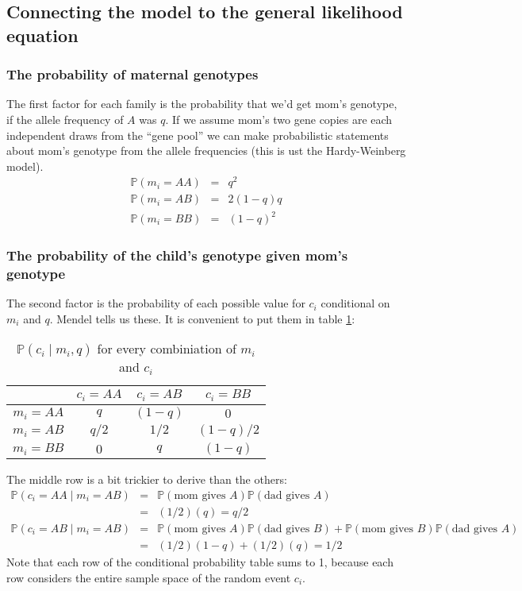 \documentclass[11pt]{article}
\renewcommand{\Pr}{\mathbb{P}}
\begin{document}
\subsection{Connecting the model to the general likelihood equation}
\subsubsection{The probability of maternal genotypes}
The first factor for each family is the probability that we'd get mom's genotype, if
the allele frequency of $A$ was $q$.
If we assume mom's two gene copies are each independent draws from the ``gene pool'' we can 
make probabilistic statements about mom's genotype from the allele frequencies (this 
is ust the Hardy-Weinberg model).
\begin{eqnarray}
  \Pr(m_i = AA) & = & q^2 \\
  \Pr(m_i = AB) & = & 2(1-q) q \\
  \Pr(m_i = BB) & = & \left(1 - q\right)^2
\end{eqnarray}

\subsubsection{The probability of the child's genotype given mom's genotype}
The second factor is the probability of each possible value for $c_i$ conditional on $m_i$ and
$q$.
Mendel tells us these.
It is convenient to put them in table \ref{childCond}:\\
\begin{table}[h!]
\begin{tabular}{|c|c|c|c|}
\hline
         & $c_i = AA$ & $c_i = AB$ & $c_i = BB$ \\
\hline 
$m_i=AA$ & $ q$                     & $(1-q)$                 &  $0$ \\
$m_i=AB$ & $q/2$                     & $1/2$                 &  $(1-q)/2$ \\
$m_i=BB$ & $0$                     & $q$                 &  $(1-q)$ \\
\hline
\end{tabular}
\caption{$\Pr(c_i\mid m_i, q)$ for every combiniation of $m_i$ and $c_i$}\label{childCond}
\end{table}


The middle row is a bit trickier to derive than the others:
\begin{eqnarray}
  \Pr(c_i = AA \mid m_i = AB) & = & \Pr(\mbox{mom gives }A)\Pr(\mbox{dad gives }A) \nonumber \\
  & = & (1/2)(q) = q/2 \\
  \Pr(c_i = AB \mid m_i = AB) & = & \Pr(\mbox{mom gives }A)\Pr(\mbox{dad gives }B) + \Pr(\mbox{mom gives }B)\Pr(\mbox{dad gives }A) \nonumber \\
  & = & (1/2)(1-q) + (1/2)(q) = 1/2
\end{eqnarray}
Note that each row of the conditional probability table sums to 1, because each
row considers the entire sample space of the random event $c_i$.
\end{document}
